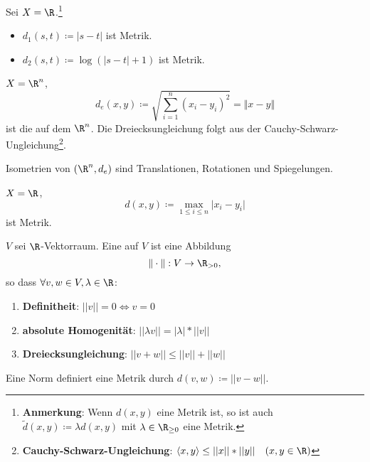 \begin{example}\label{bsp:simpleMetriken}
  Sei \( X = \R \).\footnote{\textbf{Anmerkung}: Wenn \( d(x, y) \) eine Metrik ist, so ist auch \( \widetilde{d}(x, y) \coloneqq \lambda d(x, y) \) mit \( \lambda \in \R_{\geq 0} \) eine Metrik.}
  \begin{itemize}
    \item \( d_1(s, t) \coloneqq |s-t| \) ist Metrik.
    \item \( d_2(s, t) \coloneqq \log(|s-t|+1) \) ist Metrik.
  \end{itemize}
\end{example}

\begin{example}\label{bsp:standardmetrik}
  \( X = \R^n \),
  \begin{equation*}
    d_e(x, y) \coloneqq \sqrt{\sum_{i=1}^n{(x_i-y_i)}^2} = \Vert x-y \Vert
  \end{equation*}
  ist die  auf dem \( \R^n \). Die Dreiecksungleichung folgt aus der Cauchy-Schwarz-Ungleichung\footnote{\textbf{Cauchy-Schwarz-Ungleichung}: \( \langle x, y \rangle \leq ||x||*||y|| \quad (x, y \in \R) \)}.
\end{example}

\begin{remark}[aus LA II]
  Isometrien von \( (\R^n, d_e) \) sind Translationen, Rotationen und Spiegelungen.
\end{remark}

\begin{example}[Maximumsmetrik]\label{bsp:maximumsmetrik}
  \( X = \R \),
  \begin{equation*}
    d(x, y) \coloneqq \underset{1 \leq i \leq n}{\max} \vert x_i-y_i \vert
  \end{equation*}
  ist Metrik.
\end{example}

\begin{example}\label{bsp:norm}
  \( V \) sei \( \R \)-Vektorraum. Eine  auf \( V \) ist eine Abbildung 
  \begin{equation*}
    \Vert\cdot\Vert : V \to \R_{>0}\text{,}
  \end{equation*}
  so dass \( \forall v, w \in V, \lambda \in \R \):
  \begin{enumerate}
    \item \textbf{Definitheit}: \( ||v|| = 0 \Leftrightarrow v = 0 \)
    \item \textbf{absolute Homogenität}: \( ||\lambda v|| = |\lambda| * ||v|| \)
    \item \textbf{Dreiecksungleichung}: \( ||v+w|| \leq ||v||+||w|| \)
  \end{enumerate}
  Eine Norm definiert eine Metrik durch \( d(v, w) \coloneqq ||v-w|| \).
\end{example}

